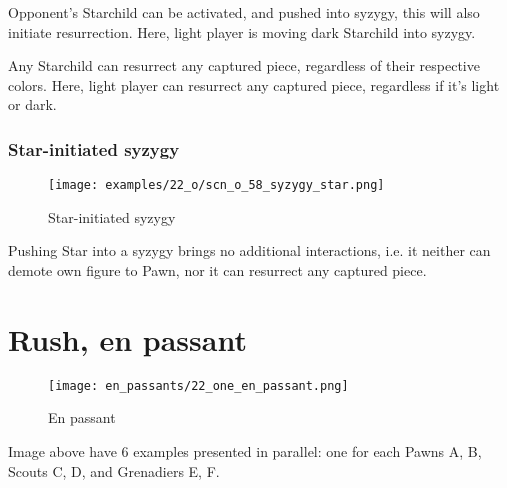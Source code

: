 Opponent's Starchild can be activated, and pushed into syzygy, this will also
initiate resurrection. Here, light player is moving dark Starchild into syzygy.

Any Starchild can resurrect any captured piece, regardless of their respective
colors. Here, light player can resurrect any captured piece, regardless if it's
light or dark.

\clearpage %

\subsubsection*{Star-initiated syzygy}
\label{sec:One/Starchild/Syzygy/Star-initiated syzygy}

\vspace*{-1.2\baselineskip}
\noindent
\begin{figure}[!h]
\texttt{[image: examples/22\_o/scn\_o\_58\_syzygy\_star.png]}
\caption{Star-initiated syzygy}
\label{fig:scn_o_58_syzygy_star}
\end{figure}

Pushing Star into a syzygy brings no additional interactions, i.e. it neither can
demote own figure to Pawn, nor it can resurrect any captured piece.

\clearpage %

\section*{Rush, en passant}
\label{sec:One/Rush, en passant}

\vspace*{-1.4\baselineskip}
\noindent
\begin{figure}[!h]
\texttt{[image: en\_passants/22\_one\_en\_passant.png]}
\vspace*{-1.3\baselineskip}
\caption{En passant}
\label{fig:22_one_en_passant}
\end{figure}

\vspace*{-0.5\baselineskip}
Image above have 6 examples presented in parallel: one for each Pawns A, B,
Scouts C, D, and Grenadiers E, F.

